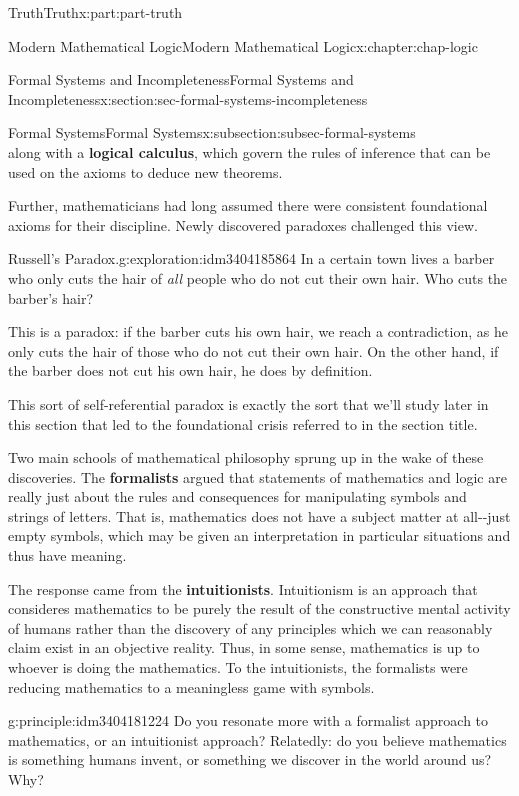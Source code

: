 \documentclass[oneside,10pt,]{book}
\newcommand{\terminology}[1]{\textbf{#1}}
\numberwithin{equation}{section}
\begin{document}
\begin{partptx}{Truth}{}{Truth}{}{}{x:part:part-truth}
\begin{chapterptx}{Modern Mathematical Logic}{}{Modern Mathematical Logic}{}{}{x:chapter:chap-logic}
\begin{sectionptx}{Formal Systems and Incompleteness}{}{Formal Systems and Incompleteness}{}{}{x:section:sec-formal-systems-incompleteness}
\begin{subsectionptx}{Formal Systems}{}{Formal Systems}{}{}{x:subsection:subsec-formal-systems}
\begin{equation*}
\end{equation*}
along with a \terminology{logical calculus}, which govern the rules of inference that can be used on the axioms to deduce new theorems.%
\par
Further, mathematicians had long assumed there were consistent foundational axioms for their discipline. Newly discovered paradoxes challenged this view.%
\begin{exploration}{Russell's Paradox.}{g:exploration:idm3404185864}%
In a certain town lives a barber who only cuts the hair of \emph{all} people who do not cut their own hair. Who cuts the barber's hair?%
\par\smallskip%
\noindent\hypertarget{g:solution:idm3404184600}{}This is a paradox: if the barber cuts his own hair, we reach a contradiction, as he only cuts the hair of those who do not cut their own hair. On the other hand, if the barber does not cut his own hair, he does by definition.%
\par
This sort of self-referential paradox is exactly the sort that we'll study later in this section that led to the foundational crisis referred to in the section title.%
\end{exploration}%
Two main schools of mathematical philosophy sprung up in the wake of these discoveries. The \terminology{formalists} argued that statements of mathematics and logic are really just about the rules and consequences for manipulating symbols and strings of letters. That is, mathematics does not have a subject matter at all-{}-{}just empty symbols, which may be given an interpretation in particular situations and thus have meaning.%
\par
The response came from the \terminology{intuitionists}. Intuitionism is an approach that consideres mathematics to be purely the result of the constructive mental activity of humans rather than the discovery of any principles which we can reasonably claim exist in an objective reality. Thus, in some sense, mathematics is up to whoever is doing the mathematics. To the intuitionists, the formalists were reducing mathematics to a meaningless game with symbols.%
\begin{principle}{}{}{g:principle:idm3404181224}%
Do you resonate more with a formalist approach to mathematics, or an intuitionist approach? Relatedly: do you believe mathematics is something humans invent, or something we discover in the world around us? Why?%
\end{principle}

\end{subsectionptx}
\end{sectionptx}
\end{chapterptx}
\end{partptx}
\end{document}
